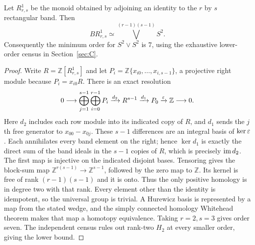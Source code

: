 \begin{proposition}\label{prop:B-band-wedge}
Let $R_{r,s}^1$ be the monoid obtained by adjoining an identity to the
$r$ by $s$ rectangular band.  Then
\[
 BR_{r,s}^1\simeq\bigvee^{(r-1)(s-1)}S^2.
\]
Consequently the minimum order for $S^2\vee S^2$ is $7$, using
the exhaustive lower-order census in Section~\ref{sec:C}.
\end{proposition}
\begin{proof}
Write $R=\mathbb Z[R_{r,s}^1]$ and let
$P_i=\mathbb Z\{x_{i0},\ldots,x_{i,s-1}\}$, a projective right
module because $P_i=x_{i0}R$.  There is an exact resolution
\[
 0\longrightarrow\bigoplus_{j=1}^{s-1}\bigoplus_{i=0}^{r-1}P_i
 \xrightarrow{d_2}R^{s-1}\xrightarrow{d_1}P_0
 \xrightarrow{\varepsilon}\mathbb Z\longrightarrow0.
\]
Here $d_2$ includes each row module into its indicated copy of $R$,
and $d_1$ sends the $j$th free generator to $x_{00}-x_{0j}$.
These $s-1$ differences are an integral basis of $\ker\varepsilon$.
Each annihilates every band element on the right; hence $\ker d_1$
is exactly the direct sum of the band ideals in the $s-1$ copies of
$R$, which is precisely $\operatorname{im} d_2$.  The first map is injective
on the indicated disjoint bases.  Tensoring gives the block-sum map
$\mathbb Z^{r(s-1)}\to\mathbb Z^{s-1}$, followed by the zero
map to $\mathbb Z$.  Its kernel is free of rank $(r-1)(s-1)$
and it is onto.  Thus the only positive homology is in degree two
with that rank.  Every element other than the identity is idempotent,
so the universal group is trivial.  A Hurewicz basis is represented
by a map from the stated wedge, and the simply connected homology
Whitehead theorem makes that map a homotopy equivalence.
Taking $r=2,s=3$ gives order seven.  The independent census rules
out rank-two $H_2$ at every smaller order, giving the lower bound.
\end{proof}


